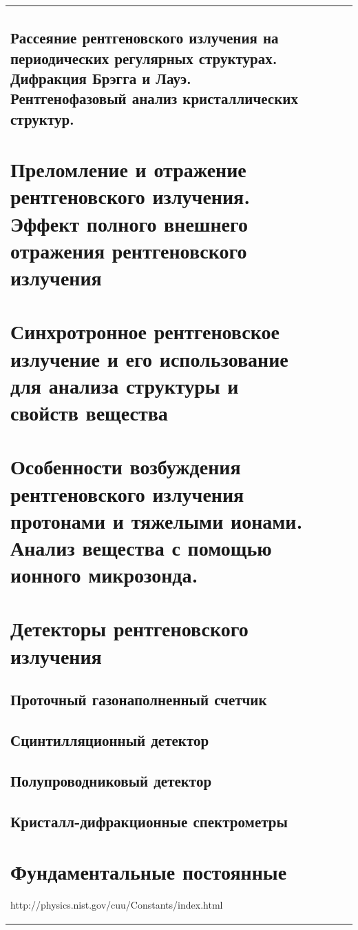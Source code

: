 \documentclass[a4paper,14pt, openany, twoside, draft]{extbook} %
\begin{document}
\begin{flushleft}
\begin{supertabular}{|m{1.7279999cm}|m{1.522cm}|m{1.522cm}|m{1.522cm}|m{1.744cm}|}
\section{Рассеяние рентгеновского излучения на периодических регулярных структурах. Дифракция Брэгга и Лауэ. Рентгенофазовый анализ кристаллических структур.}
\label{sec:bragg-diffraction}

\chapter{Преломление и отражение рентгеновского излучения. Эффект полного внешнего отражения рентгеновского излучения}
\label{cha:total-reflection}

\chapter{Синхротронное рентгеновское излучение и его использование для анализа структуры и свойств вещества}
\label{cha:syncrotron}

\chapter{Особенности возбуждения рентгеновского излучения протонами и тяжелыми ионами. Анализ вещества с помощью ионного микрозонда.}
\label{cha:ion-micro}

\chapter{Детекторы рентгеновского излучения}
\label{cha:detectors}

\section{Проточный газонаполненный счетчик}
\section{Сцинтилляционный детектор}
\section{Полупроводниковый детектор}
\section{Кристалл-дифракционные спектрометры}

\newpage
\chapter*{Фундаментальные постоянные}
{http://physics.nist.gov/cuu/Constants/index.html}


\end{supertabular}
\end{flushleft}
\end{document}
